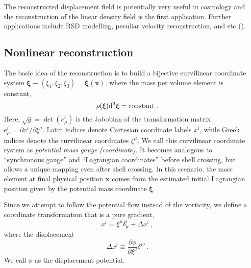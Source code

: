 \documentclass[iop]{emulateapj}
\newcommand{\be}{\begin{equation}}
\newcommand{\ee}{\end{equation}}
\newcommand{\dif}{\mathrm{d}}
\newcommand{\vecx}{{\bm{x}}}
\newcommand{\vecxi}{{\bm{\xi}}}
\begin{document}
{%
The reconstructed displacement field is potentially very useful in cosmology
and the reconstruction of the linear density field is the first application.
Further applications include RSD modelling, peculiar velocity reconstruction, and etc (\cite{zhuhm16c}).

\subsection{Nonlinear reconstruction}
\label{sec:algorithm}

The basic idea of the reconstruction is to build a bijective curvilinear coordinate system $\vecxi\equiv(\xi_1,\xi_2,
\xi_3)=\vecxi(\vecx)$, where the mass per volume element is constant,
\be
\rho(\vecxi)\dif^3\vecxi={\rm constant}\ .
\ee
Here, $\sqrt{g}=\det(e^i_\mu)$ is the Jabobian of the transformation matrix $e^i_\mu=\partial x^i/\partial\xi^\mu$.
Latin indices denote Cartesian coordinate labels $x^i$, while Greek indices denote the curvilinear coordinates $\xi^\mu$.
We call this curvilinear coordinate system as {\it potential mass gauge (coordinate)}.
It becomes analogous to ``synchronous gauge'' and ``Lagrangian coordinates'' before shell crossing, but allows a unique mapping even after shell crossing.
In this scenario, the mass element at final physical position $\vecx$ comes from the estimated initial Lagrangian position given by the potential mass coordinate $\vecxi$.

Since we attempt to follow the potential flow instead of the vorticity, we define a coordinate transformation that is a pure gradient,
\be
x^i=\xi^\mu\delta_\mu^i+\Delta x^i\ ,
\ee
where the displacement
\be
\Delta x^i\equiv\frac{\partial\phi}{\partial\xi^\nu}\delta^{i\nu}\ .
\ee
We call $\phi$ as the displacement potential.

}
\end{document}
